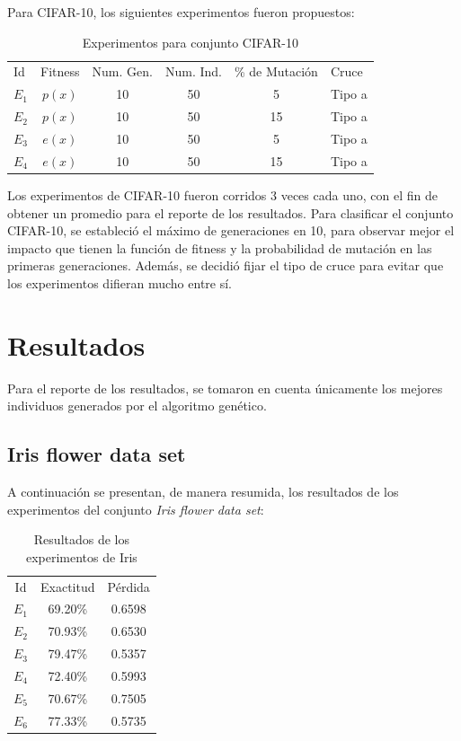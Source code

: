 \documentclass[conference]{IEEEtran}
\begin{document}
Para CIFAR-10, los siguientes experimentos fueron propuestos:
\begin{table}[h]
\centering
\caption{Experimentos para conjunto CIFAR-10}
\label{tablaC}
\begin{tabular}{lccccc}
Id    & \multicolumn{1}{l}{Fitness} & \multicolumn{1}{l}{Num. Gen.} & \multicolumn{1}{l}{Num. Ind.} & \multicolumn{1}{l}{\% de Mutación} & \multicolumn{1}{l}{Cruce} \\
$E_1$ & $p(x)$                      & 10                            & 50                            & 5                                  & Tipo a                    \\
$E_2$ & $p(x)$                      & 10                            & 50                            & 15                                 & Tipo a                    \\
$E_3$ & $e(x)$                      & 10                            & 50                            & 5                                  & Tipo a                    \\
$E_4$ & $e(x)$                      & 10                            & 50                            & 15                                 & Tipo a                   
\end{tabular}
\end{table}

Los experimentos de CIFAR-10 fueron corridos 3 veces cada uno, con el fin de obtener un promedio para el reporte de los resultados.
Para clasificar el conjunto CIFAR-10, se estableció el máximo de generaciones en 10, para observar mejor el impacto que tienen la función de fitness y la probabilidad de mutación en las primeras generaciones. Además, se decidió fijar el tipo de cruce para evitar que los experimentos difieran mucho entre sí.

\section{Resultados}
Para el reporte de los resultados, se tomaron en cuenta únicamente los mejores individuos generados por el algoritmo genético. 
\subsection{Iris flower data set}
A continuación se presentan, de manera resumida, los resultados de los experimentos del conjunto
\textit{Iris flower data set}:
	\begin{table}[h]
\centering
\caption{Resultados de los experimentos de Iris}
\label{tablaRI}
\begin{tabular}{ccc}
Id    & Exactitud & Pérdida \\
$E_1$ & 69.20\%   & 0.6598  \\
$E_2$ & 70.93\%   & 0.6530  \\
$E_3$ & 79.47\%   & 0.5357  \\
$E_4$ & 72.40\%   & 0.5993  \\
$E_5$ & 70.67\%   & 0.7505  \\
$E_6$ & 77.33\%   & 0.5735  
\end{tabular}
\end{table}
\end{document}
